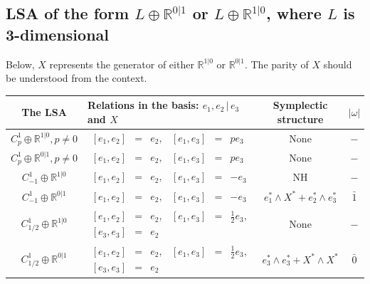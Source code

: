 \documentclass[12pt]{amsart}
\begin{document}
\normalsize 

\subsection{LSA of the form \texorpdfstring{$L\oplus \mathbb{R}^{0|1}$}{L+R} or \texorpdfstring{$L\oplus \mathbb{R}^{1|0}$,}{L+R}  where \texorpdfstring{$L$}{L} is 3-dimensional}
Below, $X$ represents the generator of either $\mathbb{R}^{1|0}$ or $\mathbb{R}^{0|1}$. The parity of $X$ should be understood from the context.

\footnotesize
\begin{table}[H]
\centering
\begin{tabular}{| c | l | c |c|}\hline
 The LSA & Relations in the basis: $e_1,e_2\,|\,e_3$ and $X$ & Symplectic structure & $|\omega|$ \\ \hline
$C^1_p\oplus \mathbb{R}^{1|0}, p\not =0$ & $
\begin{array}{lcrlcr}
[e_1,e_2]&=&e_2, & [e_1,e_3]&=&pe_3
\end{array}$ & None & $-$\\ \hline
$C^1_p\oplus \mathbb{R}^{0|1}, p\not =0$ & $
\begin{array}{lcrlcr}
[e_1,e_2]&=&e_2, & [e_1,e_3]&=&pe_3
\end{array}$ & None & $-$\\ \hline
$C^1_{-1}\oplus \mathbb{R}^{1|0}$ & $
\begin{array}{lcrlcr}
[e_1,e_2]&=&e_2, & [e_1,e_3]&=&-e_3
\end{array}$ & NH & $-$\\ \hline
$C^1_{-1}\oplus \mathbb{R}^{0|1}$ & $
\begin{array}{lcrlcr}
[e_1,e_2]&=&e_2, & [e_1,e_3]&=&-e_3
\end{array}$ & $e_1^*\wedge X^*+e_2^*\wedge e_3^*$ & $\bar 1$\\ \hline
$C^1_{1/2}\oplus \mathbb{R}^{1|0}$ & $
\begin{array}{lcrlcr}
[e_1,e_2]&=&e_2, & [e_1,e_3]&=& \frac{1}{2}e_3,\\[1mm]
[e_3,e_3]&=&e_2
\end{array}$ & None & $-$\\ \hline
$C^1_{1/2}\oplus \mathbb{R}^{0|1}$ & $
\begin{array}{lcrlcr}
[e_1,e_2]&=&e_2, & [e_1,e_3]&=& \frac{1}{2}e_3,\\[1mm]
[e_3,e_3]&=&e_2
\end{array}$ & $e_3^*\wedge e_3^*+X^*\wedge X^*$ & $\bar 0$\\ \hline

\end{tabular}
\end{table}
\end{document}
